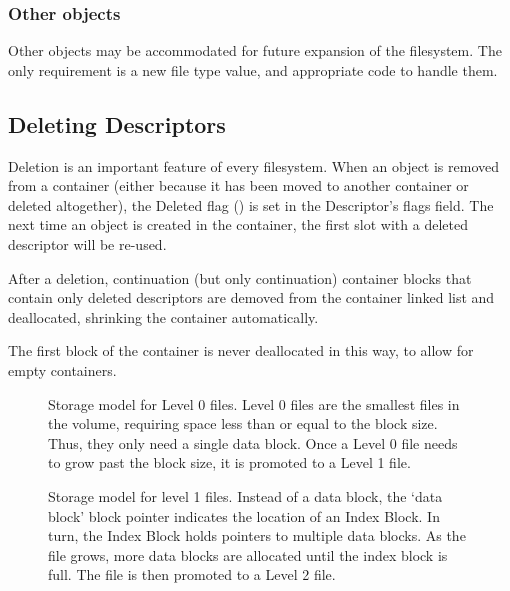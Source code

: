 \subsubsection{Other objects}

Other objects may be accommodated for future expansion of the filesystem. The
only requirement is a new file type value, and appropriate code to handle them.



\subsection{Deleting Descriptors}

Deletion is an important feature of every filesystem. When an object is removed
from a container (either because it has been moved to another container or
deleted altogether), the Deleted flag () is set in the Descriptor's
flags field. The next time an object is created in the container, the first
slot with a deleted descriptor will be re-used.

After a deletion, continuation (but only continuation) container blocks that
contain only deleted descriptors are demoved from the container linked list and
deallocated, shrinking the container automatically.

The first block of the container is never deallocated in this way, to allow for
empty containers.

\begin{figure}
 \centering
 

 \caption[Level 0 file structure]{\label{fig:file-level0} Storage
   model for Level 0 files. Level 0 files are the smallest files in
   the volume, requiring space less than or equal to the block
   size. Thus, they only need a single data block. Once a Level 0 file
   needs to grow past the block size, it is promoted to a Level 1
   file.}
\end{figure}


\begin{figure}
 \centering
 

 \caption[Level 1 file structure]{\label{fig:file-level1} Storage
   model for level 1 files. Instead of a data block, the ‘data block’
   \gls{block pointer} indicates the location of an Index Block. In
   turn, the Index Block holds pointers to multiple data blocks. As
   the file grows, more data blocks are allocated until the index
   block is full. The file is then promoted to a Level 2 file.}
\end{figure}


